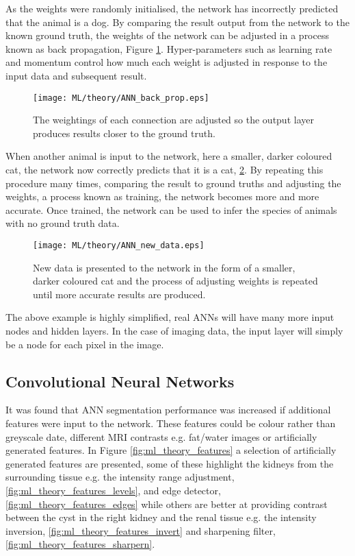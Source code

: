 As the weights were randomly initialised, the network has incorrectly predicted that the animal is a dog. By comparing the result output from the network to the known ground truth, the weights of the network can be adjusted in a process known as back propagation, Figure \ref{fig:ml_theory_adjusted}. Hyper-parameters such as learning rate and momentum control how much each weight is adjusted in response to the input data and subsequent result.

\begin{figure}[H]
	\centering
	\texttt{[image: ML/theory/ANN\_back\_prop.eps]}
	\caption{The weightings of each connection are adjusted so the output layer produces results closer to the ground truth.}
	\label{fig:ml_theory_adjusted}	
\end{figure}

When another animal is input to the network, here a smaller, darker coloured cat, the network now correctly predicts that it is a cat, \ref{fig:ml_theory_new_data}. By repeating this procedure many times, comparing the result to ground truths and adjusting the weights, a process known as training, the network becomes more and more accurate. Once trained, the network can be used to infer the species of animals with no ground truth data.

\begin{figure}[H]
	\centering
	\texttt{[image: ML/theory/ANN\_new\_data.eps]}
	\caption{New data is presented to the network in the form of a smaller, darker coloured cat and the process of adjusting weights is repeated until more accurate results are produced.}
	\label{fig:ml_theory_new_data}	
\end{figure}

The above example is highly simplified, real \ac{ANN}s will have many more input nodes and hidden layers. In the case of imaging data, the input layer will simply be a node for each pixel in the image.

\subsection{Convolutional Neural Networks}

It was found that \ac{ANN} segmentation performance was increased if additional features were input to the network. These features could be colour rather than greyscale date, different \ac{MRI} contrasts e.g. fat/water images or artificially generated features. In Figure \ref{fig:ml_theory_features} a selection of artificially generated features are presented, some of these highlight the kidneys from the surrounding tissue e.g. the intensity range adjustment, \ref{fig:ml_theory_features_levels}, and edge detector, \ref{fig:ml_theory_features_edges} while others are better at providing contrast between the cyst in the right kidney and the renal tissue e.g. the intensity inversion, \ref{fig:ml_theory_features_invert} and sharpening filter, \ref{fig:ml_theory_features_sharpern}.

